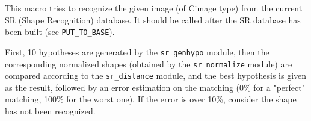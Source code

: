 This macro tries to recognize the given image (of Cimage type) from
the current SR (Shape Recognition) database.
It should be called after the SR database has been built (see 
\verb+PUT_TO_BASE+).

First, 10 hypotheses are generated by the \verb+sr_genhypo+ module, 
then the corresponding normalized shapes (obtained by the \verb+sr_normalize+
module) are compared according to the \verb+sr_distance+ module, and the 
best hypothesis is given as the result, followed by an error estimation on 
the matching (0\% for a "perfect" matching, 100\% for the worst one).
If the error is over 10\%, consider the shape has not been recognized.
